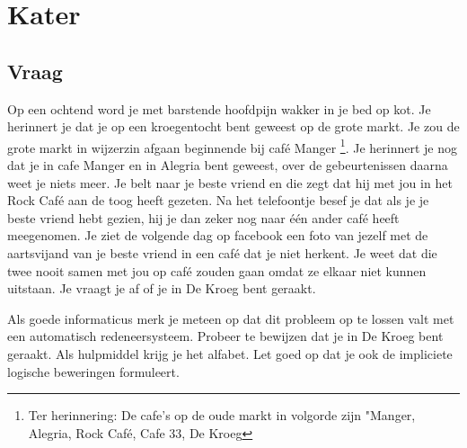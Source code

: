 \documentclass[alternative-exam.tex]{subfiles}
\begin{document}
\chapter{Kater}
\section{Vraag}
Op een ochtend word je met barstende hoofdpijn wakker in je bed op kot. Je herinnert je dat je op een kroegentocht bent geweest op de grote markt. Je zou de grote markt in wijzerzin afgaan beginnende bij caf\'e Manger \footnote{Ter herinnering: De cafe's op de oude markt in volgorde zijn "Manger, Alegria, Rock Caf\'e, Cafe 33, De Kroeg}. Je herinnert je nog dat je in cafe Manger en in Alegria bent geweest, over de gebeurtenissen daarna weet je niets meer. Je belt naar je beste vriend en die zegt dat hij met jou in het Rock Caf\'e aan de toog heeft gezeten. Na het telefoontje besef je dat als je je beste vriend hebt gezien, hij je dan zeker nog naar \'e\'en ander caf\'e heeft meegenomen. Je ziet de volgende dag op facebook een foto van jezelf met de aartsvijand van je beste vriend in een caf\'e dat je niet herkent. Je weet dat die twee nooit samen met jou op caf\'e zouden gaan omdat ze elkaar niet kunnen uitstaan. Je vraagt je af of je in De Kroeg bent geraakt.

Als goede informaticus merk je meteen op dat dit probleem op te lossen valt met een automatisch redeneersysteem. Probeer te bewijzen dat je in De Kroeg bent geraakt. Als hulpmiddel krijg je het alfabet. Let goed op dat je ook de impliciete logische beweringen formuleert.
\end{document}
